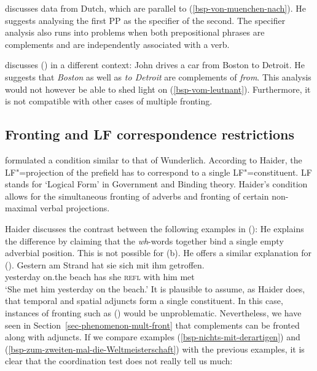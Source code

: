 \citet[]{Riemsdijk78a} discusses data from Dutch, which are parallel to 
(\ref{bsp-von-muenchen-nach}). He suggests analysing the first PP as the specifier of the second.
The specifier analysis also runs into problems when both prepositional phrases are complements and
are independently associated with a verb.

\citet[--218]{Dowty79a} discusses () in a different context:
\ea
John drives a car from Boston to Detroit.
\z
He suggests that \emph{Boston} as well as \emph{to Detroit} are complements of \emph{from}. This analysis
would not however be able to shed light on (\ref{bsp-vom-leutnant}). Furthermore, it is not compatible with
other cases of multiple fronting.

\subsection{Fronting and LF correspondence restrictions}

\citet*[]{Haider82} formulated a condition similar to that of Wunderlich. According to Haider, the LF"=projection
of the prefield has to correspond to a single LF"=constituent. LF stands for `Logical Form' in Government and Binding theory. Haider's condition
allows for the simultaneous fronting of adverbs and fronting of certain non-maximal verbal projections.

Haider discusses the contrast between the following examples in ():
\eal
{}
\zl
He explains the difference by claiming that the \emph{wh}-words together bind a single empty adverbial position. This is not
possible for (b). He offers a similar explanation for ().
\ea
\label{bsp-gestern-am-strand-haider}
\gll Gestern am Strand hat sie sich mit ihm getroffen.\\
	 yesterday on.the beach has she \textsc{refl} with him met\\
\glt `She met him yesterday on the beach.'
\z
It is plausible to assume, as Haider does, that temporal and spatial adjuncts form a single constituent. In this case, instances of fronting such as
() would be unproblematic. Nevertheless, we have seen in Section~\ref{sec-phenomenon-mult-front} that complements can be fronted along with adjuncts.
If we compare examples (\ref{bsp-nichts-mit-derartigen}) and (\ref{bsp-zum-zweiten-mal-die-Weltmeisterschaft}) with the previous examples, it is clear
that the coordination test does not really tell us much:




